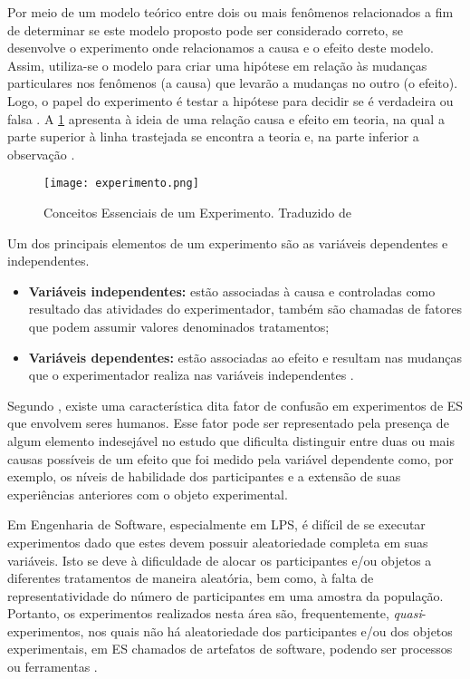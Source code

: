 Por meio de um modelo teórico entre dois ou mais fenômenos relacionados a fim de determinar se este modelo proposto pode ser considerado correto, se desenvolve o experimento onde relacionamos a causa e o efeito deste modelo. Assim, utiliza-se o modelo para criar uma hipótese em relação às mudanças particulares nos fenômenos (a causa) que levarão a mudanças no outro (o efeito). Logo, o papel do experimento é testar a hipótese para decidir se é verdadeira ou falsa \cite{kitchenham2015evidence}. A \ref{fig:experimento} apresenta à ideia de uma relação causa e efeito em teoria, na qual a parte superior à linha trastejada se encontra a teoria e, na parte inferior a observação \cite{wohlin2012experimentation}.

\begin{figure}[htb]
	\centering					
	{\texttt{[image: experimento.png]}}
	
	\caption{Conceitos Essenciais de um Experimento. Traduzido de \citet{wohlin2012experimentation} }
	\label{fig:experimento}
\end{figure}

Um dos principais elementos de um experimento são as variáveis dependentes e independentes. 

\begin{itemize}
	\item \textbf{Variáveis independentes:} estão associadas à causa e controladas como resultado das atividades do experimentador, também são chamadas de fatores que podem assumir valores denominados tratamentos;
	\item \textbf{Variáveis dependentes:} estão associadas ao efeito e resultam nas mudanças que o experimentador realiza nas variáveis independentes \cite{kitchenham2015evidence}. 
\end{itemize}

Segundo \citealt{kitchenham2015evidence}, existe uma característica dita fator de confusão em experimentos de ES que envolvem seres humanos. Esse fator pode ser representado pela presença de algum elemento indesejável no estudo que dificulta distinguir entre duas ou mais causas possíveis de um efeito que foi medido pela variável dependente como, por exemplo, os níveis de habilidade dos participantes e a extensão de suas experiências anteriores com o objeto experimental.

Em Engenharia de Software, especialmente em LPS, é difícil de se executar experimentos dado que estes devem possuir aleatoriedade completa em suas variáveis. Isto se deve à dificuldade de alocar os participantes e/ou objetos a diferentes tratamentos de maneira aleatória, bem como, à falta de representatividade do número de participantes em uma amostra da população. Portanto, os experimentos realizados nesta área são, frequentemente, \textit{quasi}-experimentos, nos quais não há aleatoriedade dos participantes e/ou dos objetos experimentais, em ES chamados de artefatos de software, podendo ser processos ou ferramentas \cite{wohlin2012experimentation}.

